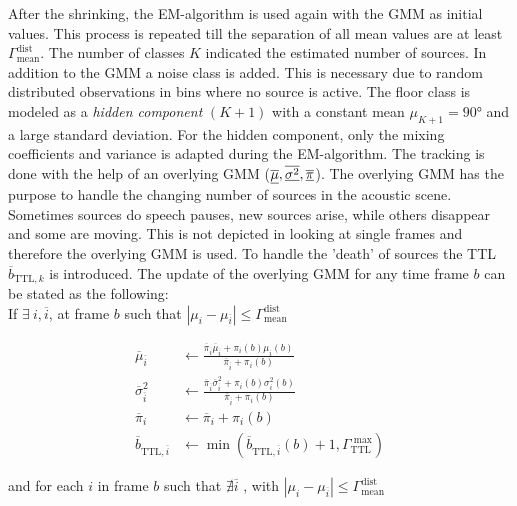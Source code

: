 After the shrinking, the \ac{EM}-algorithm is used again with the \ac{GMM}
as initial values. This process is repeated till the separation of all mean values are at least $\Gamma_\text{mean}^\text{dist}$. The number of classes $K$ indicated the estimated number of sources. In addition to the \ac{GMM} a noise class is added. This is necessary due to random distributed observations in bins where no source is active. The floor class is modeled as a \emph{hidden component} $(K+1)$ with a constant mean $\mu_{K+1}=\ang{90}$ and a large standard deviation. For the hidden component, only the mixing coefficients and variance is adapted during the \ac{EM}-algorithm. The tracking is done with the help of an overlying \ac{GMM} ($\underline{\overline{\mu}}, \underline{\overline{\sigma^2}}, \underline{\overline{\pi}}$). The overlying \ac{GMM} has the purpose to handle the changing number of sources in the acoustic scene. Sometimes sources do speech pauses, new sources  arise, while others disappear and some are moving. This is not depicted in looking at single frames and therefore the overlying \ac{GMM} is used. To handle the 'death' of sources the \ac{TTL} $\overline b_{\text{TTL},k}$ is introduced. The update of the overlying \ac{GMM} for any time frame $b$ can be stated as the following:\\
If $\exists\ i, \overline i$, at frame $b$ such that $|\mu_i-\mu_{\overline i}|\leq\Gamma_\text{mean}^\text{dist}$

\begin{equation}
\begin{split}
\overline \mu_{\overline i} &\leftarrow \frac{\overline \pi_{\overline i}\overline \mu_{\overline i}+\pi_{i}(b)\mu_{i}(b)}{\overline \pi_{\overline i}+\pi_{i}(b)}\\
\overline\sigma^2_{\overline i} &\leftarrow \frac{\overline\pi_{\overline i}\overline\sigma^2_{\overline i}+\pi_{i}(b)\sigma^2_{i}(b)}{\overline\pi_{\overline i}+\pi_{i}(b)}\\
\overline\pi_i &\leftarrow \overline\pi_i+\pi_{i}(b)\\
\overline b_{\text{TTL},{\overline i}} &\leftarrow \min( \overline b_{\text{TTL},{\overline i}}(b)+1,\Gamma^\text{ max}_\text{TTL})
\end{split}
\label{eq:madhu_update}
\end{equation}

and for each $i$ in frame $b$ such that $\nexists \overline i$ , with  $|\mu_i-\mu_{\overline i}|\leq\Gamma_\text{mean}^\text{dist}$

